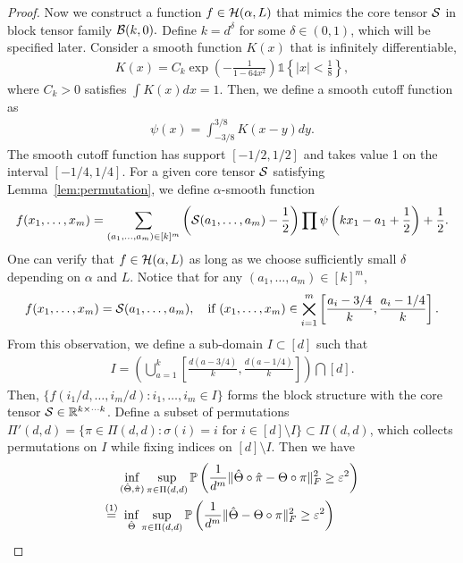 \documentclass[11pt]{article}
\theoremstyle{definition}
\begin{document}
\begin{proof}
Now we construct a function $f\in\mathcal{H}(\alpha,L)$ that mimics the core tensor $\mathcal{S}$ in block tensor family $\mathcal{B}(k,0).$  Define $k = d^\delta$ for some $\delta\in(0,1)$, which will be specified later. Consider a smooth function $K(x)$ that is infinitely differentiable,
\begin{align}
    K(x) = C_k\exp\left(-\frac{1}{1-64x^2}\right)\mathds{1}\left\{|x|<\frac{1}{8}\right\},
\end{align}
where $C_k>0$ satisfies $\int K(x)dx = 1.$  Then, we define a smooth cutoff function as
\begin{align}
    \psi(x) = \int_{-3/8}^{3/8}K(x-y)dy.
\end{align}
The smooth cutoff function has support $[-1/2,1/2]$ and takes value 1 on the interval $[-1/4,1/4]$. 
For a given  core tensor $\mathcal{S}$ satisfying Lemma~\ref{lem:permutation}, we define $\alpha$-smooth function
\begin{align}\label{eq:constructf}
    f(x_1,\ldots,x_m) = \sum_{(a_1,\ldots,a_m)\in[k]^m}\left(\mathcal{S}(a_1,\ldots,a_m)-\frac{1}{2}\right)\prod \psi\left(kx_1-a_1+\frac{1}{2}\right) + \frac{1}{2}.
\end{align}
One can verify that $f\in\mathcal{H}(\alpha,L)$ as long as we choose sufficiently small $\delta$ depending on $\alpha$ and $L$. Notice that for any $(a_1,\ldots,a_m)\in [k]^m$, 
\begin{align}
f(x_1,\ldots,x_m) = \mathcal{S}(a_1,\ldots,a_m), \quad \text{if } (x_1,\ldots,x_m)\in \bigtimes_{i=1}^m\left[\frac{a_i-3/4}{k},\frac{a_i-1/4}{k}\right].
\end{align}
From this observation, we define a sub-domain $I\subset [d]$ such that
\begin{align}
    I = \left(\bigcup_{a=1}^k\left[\frac{d(a-3/4)}{k},\frac{d(a-1/4)}{k}\right]\right)\bigcap [d].
\end{align}
Then, $\{f(i_1/d,\ldots,i_m/d)\colon i_1,\ldots,i_m\in I\}$  forms the block structure with the core tensor $\mathcal{S}\in\mathbb{R}^{k\times\cdots k}$. Define a subset of permutations $\Pi'(d,d) = \{\pi\in\Pi(d,d)\colon \sigma(i) = i \text{ for } i\in[d]\setminus I\}\subset \Pi(d,d)$, which collects permutations on $I$ while fixing indices on $[d]\setminus I$. Then we have 
\begin{align}\label{eq:lower}
&\inf_{(\hat \Theta,\hat \pi)}\sup_{\pi\in \Pi(d,d)}\mathbb{P}\left({1\over d^m}\FnormSize{}{\hat \Theta\circ \hat \pi-\Theta\circ \pi}^2\geq \varepsilon^2\right)\notag \\
\stackrel{(1)}{=}&\ \inf_{\hat \Theta}\sup_{\pi\in \Pi(d,d)}\mathbb{P}\left({1\over d^m}\FnormSize{}{\hat \Theta-\Theta\circ \pi}^2\geq \varepsilon^2\right)\notag \\

\end{align}
\end{proof}
\end{document}
